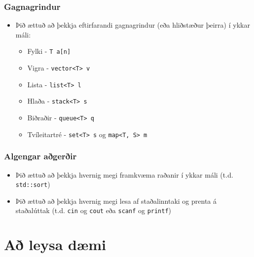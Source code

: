 \documentclass{beamer}
\begin{document}
\begin{frame}
\frametitle{Gagnagrindur}

\begin{itemize}

\item<1-> Þið ættuð að þekkja eftirfarandi gagnagrindur (eða hliðstæður þeirra) í ykkar máli: 

\begin{itemize}

\item<2-> Fylki - \texttt{T a[n]}

\item<3-> Vigra - \texttt{vector<T> v}

\item<4-> Lista - \texttt{list<T> l}

\item<5-> Hlaða - \texttt{stack<T> s}

\item<6-> Biðraðir - \texttt{queue<T> q}

\item<7-> Tvíleitartré - \texttt{set<T> s} og \texttt{map<T, S> m}

\end{itemize}

\end{itemize}

\end{frame}

\begin{frame}
\frametitle{Algengar aðgerðir}

\begin{itemize}

\item<1-> Þið ættuð að þekkja hvernig megi framkvæma raðanir í ykkar máli (t.d. \texttt{std::sort})

\item<2-> Þið ættuð að þekkja hvernig megi lesa af staðalinntaki og prenta á staðalúttak (t.d. \texttt{cin} og \texttt{cout} eða \texttt{scanf} og \texttt{printf})

\end{itemize}

\end{frame}

\section[Að leysa dæmi]{Að leysa dæmi}
\end{document}

